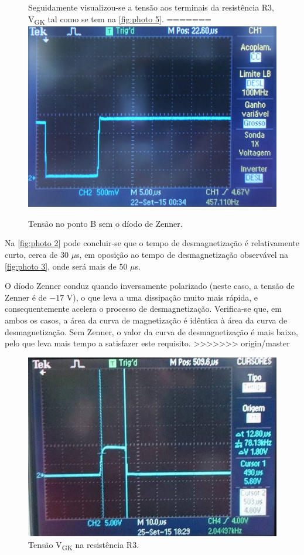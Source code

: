 \documentclass[a4paper,11pt]{article}
\numberwithin{equation}{section}
\begin{document}
\begin{figure}[h]
Seguidamente visualizou-se a tensão aos terminais da resistência R$3$,  V\textsubscript{GK} tal como se tem na \autoref{fig:photo 5}.
=======
	\includegraphics[keepaspectratio=true, scale=0.14]{img/DSC0119}
	\caption{Tensão no ponto B sem o díodo de Zenner.}
	\label{fig:photo 3}
	\vspace{-0.8em}
\end{figure}

Na \autoref{fig:photo 2} pode concluir-se que o tempo de desmagnetização é relativamente curto, cerca de $30$ $\mu$s, em oposição ao tempo de desmagnetização observável na \autoref{fig:photo 3}, onde será mais de $50$ $\mu$s.

O díodo Zenner conduz quando inversamente polarizado (neste caso, a tensão de Zenner é de $-17$ V), o que leva a uma dissipação muito mais rápida, e consequentemente acelera o processo de desmagnetização. Verifica-se que, em ambos os casos, a área da curva de magnetização é idêntica à área da curva de desmagnetização. Sem Zenner, o valor da curva de desmagnetização é mais baixo, pelo que leva mais tempo a satisfazer este requisito. 
>>>>>>> origin/master

\begin{figure}[h]
	\centering
	\includegraphics[keepaspectratio=true, scale=0.8]{img/fig8}
	\caption{Tensão V\textsubscript{GK} na resistência R$3$.}
	\label{fig:photo 5}
	\vspace{-0.8em}
\end{figure}
\end{document}
